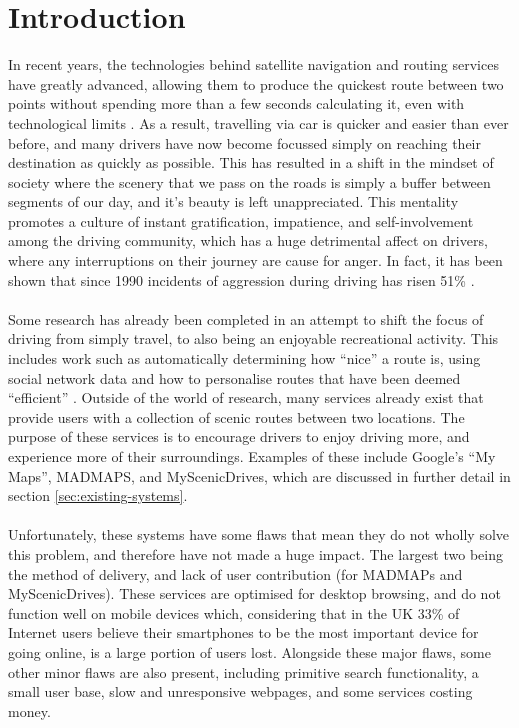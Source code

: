 \section{Introduction}
In recent years, the technologies behind satellite navigation and routing services have greatly advanced, allowing them to produce the quickest route between two points without spending more than a few seconds calculating it, even with technological limits \cite{lou2009map}. As a result, travelling via car is quicker and easier than ever before, and many drivers have now become focussed simply on reaching their destination as quickly as possible. This has resulted in a shift in the mindset of society where the scenery that we pass on the roads is simply a buffer between segments of our day, and it's beauty is left unappreciated. This mentality promotes a  culture of instant gratification, impatience, and self-involvement among the driving community, which has a huge detrimental affect on drivers, where any interruptions on their journey are cause for anger. In fact, it has been shown that since 1990 incidents of aggression during driving has risen 51\% \cite{vest1997road}. \ \\
\ \\
Some research has already been completed in an attempt to shift the focus of driving from simply travel, to also being an enjoyable recreational activity. This includes work such as automatically determining how ``nice'' a route is, using social network data \cite{peregrino2012mapping}\cite{van2011time} and how to personalise routes that have been deemed ``efficient'' \cite{chen2011discovering}. Outside of the world of research, many services already exist that provide users with a collection of scenic routes between two locations. The purpose of these services is to encourage drivers to enjoy driving more, and experience more of their surroundings. Examples of these include Google's ``My Maps''\cite{url2015gmaps}, MADMAPS\cite{url2015madmaps}, and MyScenicDrives\cite{url2015myscenicdrives}, which are discussed in further detail in section \ref{sec:existing-systems}.\ \\
\ \\
Unfortunately, these systems have some flaws that mean they do not wholly solve this problem, and therefore have not made a huge impact. The largest two being the method of delivery, and lack of user contribution (for MADMAPs and MyScenicDrives). These services are optimised for desktop browsing, and do not function well on mobile devices which, considering that in the UK 33\% of Internet users believe their smartphones to be the most important device for going online, is a large portion of users lost\cite{ofcom2015comms}. Alongside these major flaws, some other minor flaws are also present, including primitive search functionality, a small user base, slow and unresponsive webpages, and some services costing money.\ \\
